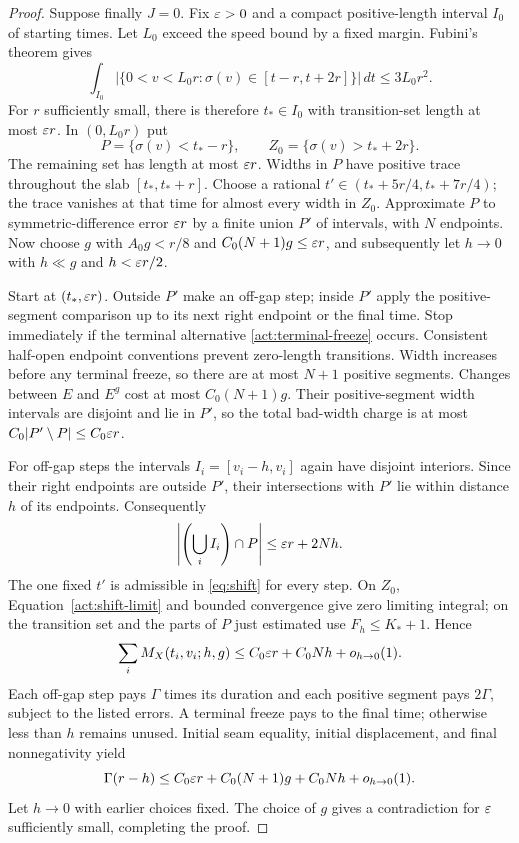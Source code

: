 \begin{proof}
Suppose finally $J=0$.  Fix $\varepsilon>0$ and a compact positive-length
interval $I_0$ of starting times.  Let $L_0$ exceed the speed bound
by a fixed margin.  Fubini's theorem gives
\[
 \int_{I_0}\bigl|\{0<v<L_0r:
          \sigma(v)\in[t-r,t+2r]\}\bigr|\,dt
 \le3L_0r^2.
\]
For $r$ sufficiently small, there is therefore $t_*\in I_0$ with
transition-set length at most $\varepsilon r$.  In $(0,L_0r)$ put
\[
 P=\{\sigma(v)<t_*-r\},\qquad
 Z_0=\{\sigma(v)>t_*+2r\}.
\]
The remaining set has length at most $\varepsilon r$.  Widths in $P$
have positive trace throughout the slab $[t_*,t_*+r]$.
Choose a rational $t'\in(t_*+5r/4,t_*+7r/4)$; the trace vanishes
at that time for almost every width in $Z_0$.
Approximate $P$ to symmetric-difference error $\varepsilon r$ by a
finite union $P'$ of intervals, with $N$ endpoints.  Now choose
$g$ with $A_0g<r/8$ and $C_0(N+1)g\le\varepsilon r$, and subsequently
let $h\to0$ with $h\ll g$ and $h<\varepsilon r/2$.

Start at $(t_*,\varepsilon r)$.  Outside $P'$ make an off-gap step;
inside $P'$ apply the positive-segment comparison up to its next
right endpoint or the final time.  Stop immediately if the
terminal alternative \eqref{act:terminal-freeze} occurs.
Consistent half-open endpoint conventions prevent zero-length
transitions.  Width increases before any terminal freeze, so
there are at most $N+1$ positive segments.  Changes between
$E$ and $E^g$ cost at most $C_0(N+1)g$.
Their positive-segment width intervals are disjoint and lie in
$P'$, so the total bad-width charge is at most
$C_0|P'\setminus P|\le C_0\varepsilon r$.

For off-gap steps the intervals $I_i=[v_i-h,v_i]$ again have
disjoint interiors.  Since their right endpoints are outside
$P'$, their intersections with $P'$ lie within distance $h$ of
its endpoints.  Consequently
\[
 \left|\left(\bigcup_iI_i\right)\cap P\right|
 \le\varepsilon r+2Nh.
\]
The one fixed $t'$ is admissible in \eqref{eq:shift} for every
step.  On $Z_0$, Equation~\eqref{act:shift-limit} and bounded
convergence give zero limiting integral; on the transition set
and the parts of $P$ just estimated use $F_h\le K_*+1$.
Hence
\[
 \sum_iM_X(t_i,v_i;h,g)
 \le C_0\varepsilon r+C_0Nh+o_{h\to0}(1).
\]
Each off-gap step pays $\Gamma$ times its duration and each
positive segment pays $2\Gamma$, subject to the listed errors.
A terminal freeze pays to the final time; otherwise less than
$h$ remains unused.  Initial seam equality, initial displacement,
and final nonnegativity yield
\[
 \Gamma(r-h)\le C_0\varepsilon r+C_0(N+1)g+C_0Nh+o_{h\to0}(1).
\]
Let $h\to0$ with earlier choices fixed.  The choice of $g$ gives
a contradiction for $\varepsilon$ sufficiently small, completing the proof.
\end{proof}

